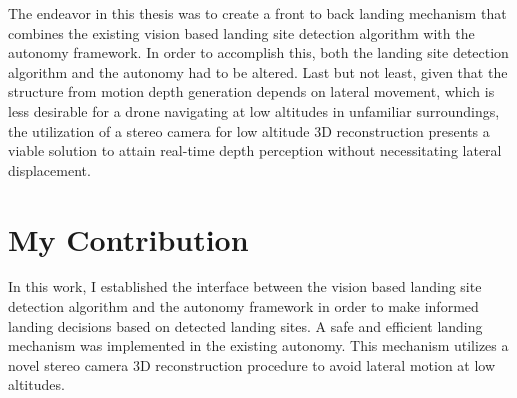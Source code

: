 The endeavor in this thesis was to create a front to back landing mechanism that combines the existing vision based landing site detection algorithm with the autonomy framework. In order to accomplish this, both the landing site detection algorithm and the autonomy had to be altered. Last but not least, given that the structure from motion depth generation depends on lateral movement, which is less desirable for a drone navigating at low altitudes in unfamiliar surroundings, the utilization of a stereo camera for low altitude 3D reconstruction presents a viable solution to attain real-time depth perception without necessitating lateral displacement.

\section{My Contribution}
In this work, I established the interface between the vision based landing site detection algorithm and the autonomy framework in order to make informed landing decisions based on detected landing sites. A safe and efficient landing mechanism was implemented in the existing autonomy. This mechanism utilizes a novel stereo camera 3D reconstruction procedure to avoid lateral motion at low altitudes.

